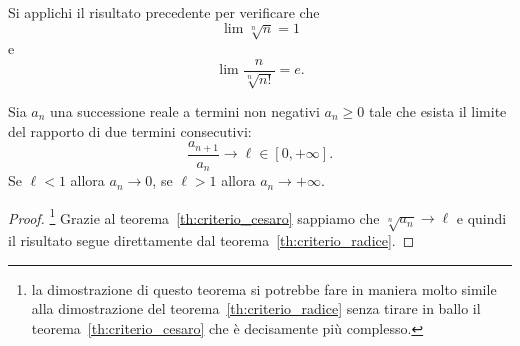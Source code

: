 \begin{exercise}
Si applichi il risultato precedente per
verificare che
\[
   \lim \sqrt[n]{n} = 1
\]
e
\[
  \lim \frac{n}{\sqrt[n]{n!}} = e.
\]
\end{exercise}

\begin{theorem}
\label{th:criterio_rapporto}
  Sia $a_n$ una successione reale a termini non negativi
  $a_n \ge 0$ tale che esista il limite del rapporto di due termini consecutivi:
  \[
     \frac{a_{n+1}}{a_n} \to \ell \in [0,+\infty].
  \]
  Se $\ell < 1$ allora $a_n \to 0$, se $\ell >1$ allora $a_n \to +\infty$.
\end{theorem}
%
\begin{proof}\footnote{%
  la dimostrazione di questo teorema si potrebbe fare in maniera
  molto simile alla dimostrazione del teorema~\ref{th:criterio_radice}
  senza tirare in ballo il teorema~\ref{th:criterio_cesaro} che è decisamente più complesso.
  }
Grazie al teorema~\ref{th:criterio_cesaro} sappiamo
che $\sqrt[n]{a_n}\to \ell$ e quindi il risultato
segue direttamente dal teorema~\ref{th:criterio_radice}.
\end{proof}



\begin{comment}
Supponiamo sia $\ell<1$. Posto $q=(1+\ell)/2$ si ha $\ell < q  < 1$
e posto $\eps=q-\ell>0$ per la definizione di limite $\frac{a_{n+1}}{a_n}\to \ell$ dovrà esistere un $N\in \NN$ tale
che per ogni $n\ge N$ si abbia:
\[
  \frac{a_{n+1}}{a_n} < \ell + \eps = q
\]
ovvero $a_{n+1} < q \cdot a_n$. In particolare si avrà:
\begin{align*}
  a_{N+1} &< q \cdot a_N \\
  a_{N+2} &< q \cdot a_{N+1} < q^2\cdot a_N \\
  a_{N+3} &< q \cdot a_{N+2} < q^3\cdot a_N \\
  \vdots
\end{align*}
ed è chiaro che per induzione potremo dimostrare che per
ogni $k\in \NN$ si ha
\[
  a_{N+k} < q^k\cdot a_N.
\]
Osserviamo però che $q^k \cdot a_N \to 0$ per $k\to +\infty$
in quanto $q<1$ e quindi $q^k \to 0$. Dunque, tolti i primi $N$ termini, la successione $a_n$ tende a zero. Ma i primi $N$ termini non influenzano né il carattere né il limite della successione e quindi l'intera successione $a_n$ tende a zero.

Il caso $\ell>1$ si fa in maniera analoga. Si sceglie $q$ tale
che $1<q<\ell$ e si trova, in maniera analoga al caso precedente,
che per un certo $N\in \NN$ e per ogni $k\in \NN$ si ha
\[
  a_{N+k} > q^k \cdot a_N \to +\infty.
\]
\end{proof}
\end{comment}

